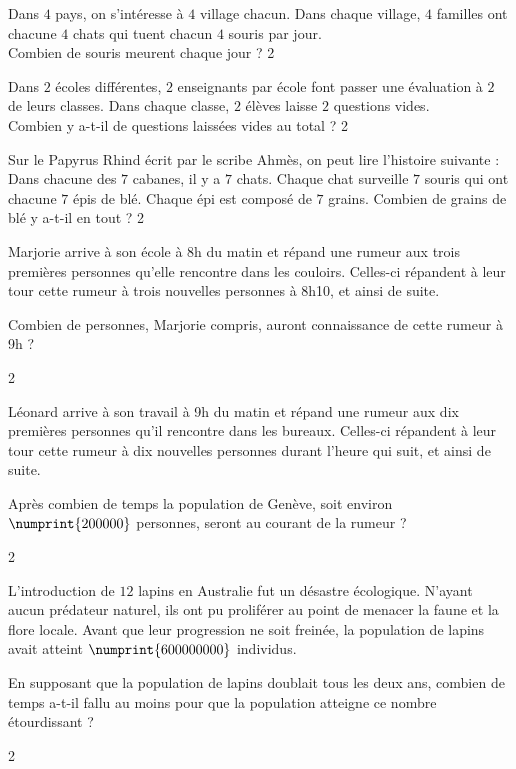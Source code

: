 \documentclass[a4paper,11pt]{report}
\begin{document}
\begin{exo}{
Dans $4$ pays, on s'intéresse à $4$ village chacun. Dans chaque village, $4$ familles ont chacune $4$ chats qui tuent chacun $4$ souris par jour. \\ Combien de souris meurent chaque jour ?
}{2}    
\end{exo}


\begin{exo}{
Dans $2$ écoles différentes, $2$ enseignants par école font passer une évaluation à $2$ de leurs classes. Dans chaque classe, $2$ élèves laisse $2$ questions vides. \\ Combien y a-t-il de questions laissées vides au total ?
}{2}    
\end{exo}

\begin{exo}{
Sur le Papyrus Rhind écrit par le scribe Ahmès, on peut lire l'histoire suivante : Dans chacune des $7$ cabanes, il y a $7$ chats. Chaque chat surveille $7$ souris qui ont chacune $7$ épis de blé. Chaque épi est composé de $7$ grains. Combien de grains de blé y a-t-il en tout ?
}{2}
\end{exo}


\begin{exo}{
Marjorie arrive à son école à 8h du matin et répand une rumeur aux trois premières personnes qu'elle rencontre dans les couloirs. Celles-ci répandent à leur tour cette rumeur à trois nouvelles personnes à 8h10, et ainsi de suite.

Combien de personnes, Marjorie compris, auront connaissance de cette rumeur à 9h ?

}{2}    
\end{exo}


\begin{exo}{
Léonard arrive à son travail à 9h du matin et répand une rumeur aux dix premières personnes qu'il rencontre dans les bureaux. Celles-ci répandent à leur tour cette rumeur à dix nouvelles personnes durant l'heure qui suit, et ainsi de suite.

Après combien de temps la population de Genève, soit environ $\numprint{200000}$ personnes, seront au courant de la rumeur ?
}{2}    
\end{exo}


\begin{exo}{
L'introduction de $12$ lapins en Australie fut un désastre écologique. N'ayant aucun prédateur naturel, ils ont pu proliférer au point de menacer la faune et la flore locale. Avant que leur progression ne soit freinée, la population de lapins avait atteint $\numprint{600000000}$ individus.

En supposant que la population de lapins doublait tous les deux ans, combien de temps a-t-il fallu au moins pour que la population atteigne ce nombre étourdissant ?
}{2}
\end{exo}
\end{document}
